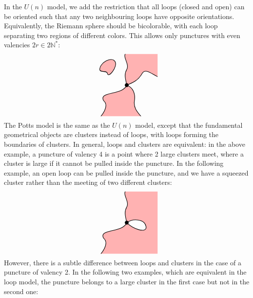 \documentclass[12pt, a4paper]{article}
\theoremstyle{break}
\begin{document}
In the $U(n)$ model, we add the restriction that all loops (closed and open) can be oriented such that any two neighbouring loops have opposite orientations. Equivalently, the Riemann sphere should be bicolorable, with each loop separating two regions of different colors. This allows only punctures with even valencies $2r\in 2\mathbb{N}^*$:
\begin{align}
 \begin{tikzpicture}[baseline=(current  bounding  box.center), scale = .4]
 \clip (-4, -4) rectangle (4, 4);
  \filldraw[thick, fill = red!30] (0, 0) to [out = 100, in = -120] (0, 2) to [out = 60, in = -150] (0, 4.2) -- (4.2, 4.2) -- (4.2, 1) to [out = 160, in = 60] (2, 1.5) to [out = -120, in = 20] (0, 0);
  \filldraw[thick, fill = red!30] (0, 0) to [out = -20, in = 80] (1, -2) to [out = -100, in = 130] (2, -4.2) -- (-3.5, -4.2) to [out = 50, in = -40] (-3, -2) to [out = 120, in = -110] (0, 0);
  \filldraw[thick, fill = red!30] (-3.5, 2) to [out = 90, in = 120] (-1.5, 3) to [out = -60, in = -80] (-2.5, 1.5) to [out = 100, in = -90] (-3.5, 2);
   \draw (0, 0) node[fill, circle, minimum size = 2mm, inner sep = 0]{};
 \end{tikzpicture}
\end{align}
The Potts model is the same as the $U(n)$ model, except that the fundamental geometrical objects are clusters instead of loops, with loops forming the boundaries of clusters. In general, loops and clusters are equivalent: in the above example, a puncture of valency 4 is a point where 2 large clusters meet, where a cluster is large if it cannot be pulled inside the puncture. In the following example, an open loop can be pulled inside the puncture, and we have a squeezed cluster rather than the meeting of two different clusters:
\begin{align}
 \begin{tikzpicture}[baseline=(current  bounding  box.center), scale = .4]
  \clip (-4, -4) rectangle (4, 4);
  \filldraw[thick, fill = red!30] (0, 0) to [out = 100, in = -120] (0, 2) to [out = 60, in = -150] (0, 4.2) -- (4.2, 4.2) -- (4.2, -4.2) -- (-3.5, -4.2) to [out = 50, in = -40] (-3, -2) to [out = 120, in = -110] (0, 0) to [out = -50, in = -80] (2.5, -.5) to [out = 100, in = 35] (0, 0);
   \draw (0, 0) node[fill, circle, minimum size = 2mm, inner sep = 0]{};
 \end{tikzpicture}
\end{align}
However, there is a subtle difference between loops and clusters in the case of a puncture of valency 2. In the following two examples, which are equivalent in the loop model, the puncture belongs to a large cluster in the first case but not in the second one: 
\end{document}
